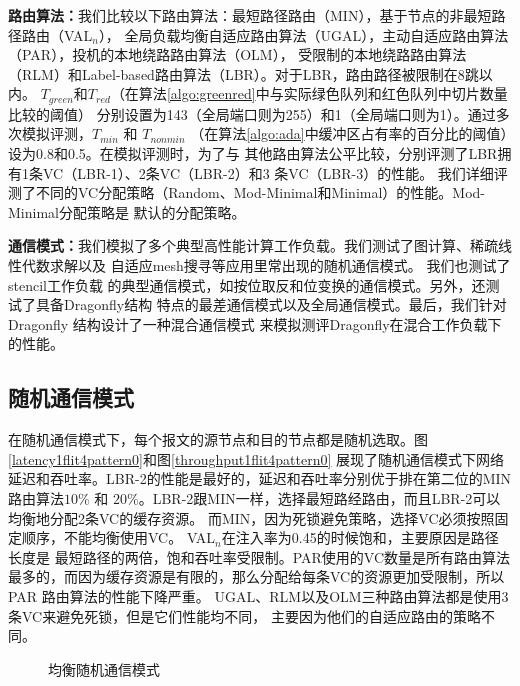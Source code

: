 \textbf{路由算法：}我们比较以下路由算法：最短路径路由（MIN），基于节点的非最短路径路由（VAL$_n$），
全局负载均衡自适应路由算法（UGAL），主动自适应路由算法（PAR），投机的本地绕路路由算法（OLM），
受限制的本地绕路路由算法（RLM）和Label-based路由算法（LBR）。对于LBR，路由路径被限制在8跳以内。
$T_{green}$和$T_{red}$（在算法\ref{algo:greenred}中与实际绿色队列和红色队列中切片数量比较的阈值）
分别设置为143（全局端口则为255）和1（全局端口则为1）。通过多次模拟评测，$T_{min}$ 和 $T_{nonmin}$
（在算法\ref{algo:ada}中缓冲区占有率的百分比的阈值）设为0.8和0.5。在模拟评测时，为了与
其他路由算法公平比较，分别评测了LBR拥有1条VC（LBR-1）、2条VC（LBR-2）和3 条VC（LBR-3）的性能。
我们详细评测了不同的VC分配策略（Random、Mod-Minimal和Minimal）的性能。Mod-Minimal分配策略是
默认的分配策略。

\textbf{通信模式：}我们模拟了多个典型高性能计算工作负载。我们测试了图计算、稀疏线性代数求解以及
自适应mesh搜寻等应用里常出现的随机通信模式。 我们也测试了stencil工作负载
的典型通信模式，如按位取反和位变换的通信模式。另外，还测试了具备Dragonfly结构
特点的最差通信模式以及全局通信模式。最后，我们针对Dragonfly 结构设计了一种混合通信模式
来模拟测评Dragonfly在混合工作负载下的性能。


\subsection{随机通信模式}

在随机通信模式下，每个报文的源节点和目的节点都是随机选取。图\ref{latency1flit4pattern0}和图\ref{throughput1flit4pattern0}
展现了随机通信模式下网络延迟和吞吐率。LBR-2的性能是最好的，延迟和吞吐率分别优于排在第二位的MIN路由算法$10\%$ 和
$20\%$。LBR-2跟MIN一样，选择最短路经路由，而且LBR-2可以均衡地分配2条VC的缓存资源。
而MIN，因为死锁避免策略，选择VC必须按照固定顺序，不能均衡使用VC。
VAL$_n$在注入率为0.45的时候饱和，主要原因是路径长度是
最短路径的两倍，饱和吞吐率受限制。PAR使用的VC数量是所有路由算法最多的，而因为缓存资源是有限的，那么分配给每条VC的资源更加受限制，所以PAR
路由算法的性能下降严重。
UGAL、RLM以及OLM三种路由算法都是使用3条VC来避免死锁，但是它们性能均不同，
主要因为他们的自适应路由的策略不同。


\begin{figure*}[htbp]
  \centering
  \begin{minipage}[t]{\textwidth}
  \centering
  \caption{均衡随机通信模式}
  \label{fig:random}
  \end{minipage}
  \end{figure*}

